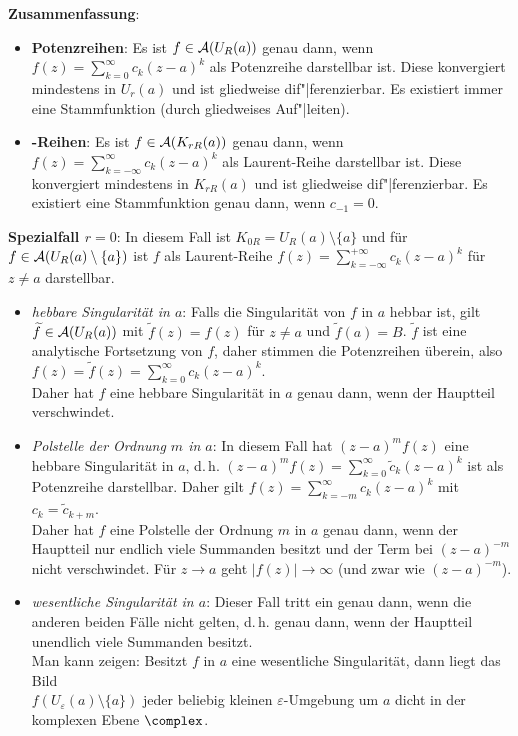 \textbf{Zusammenfassung}:
\begin{itemize}
    \item
    \textbf{Potenzreihen}:
    Es ist $f \in \mathcal{A}(U_R(a))$ genau dann, wenn
    $f(z) = \sum_{k=0}^\infty c_k (z - a)^k$ als Potenzreihe darstellbar ist.
    Diese konvergiert mindestens in $U_r(a)$ und ist gliedweise
    dif"|ferenzierbar.
    Es existiert immer eine Stammfunktion (durch gliedweises Auf"|leiten).
    
    \item
    \textbf{-Reihen}:
    Es ist $f \in \mathcal{A}(K_{rR}(a))$ genau dann, wenn
    $f(z) = \sum_{k=-\infty}^\infty c_k (z - a)^k$ als
    Laurent-Reihe darstellbar ist.
    Diese konvergiert mindestens in $K_{rR}(a)$ und ist gliedweise
    dif"|ferenzierbar.
    Es existiert eine Stammfunktion genau dann, wenn $c_{-1} = 0$.
\end{itemize}

\linie

\textbf{Spezialfall $r = 0$}:
In diesem Fall ist $K_{0R} = U_R(a) \setminus \{a\}$
und für $f \in \mathcal{A}(U_R(a) \setminus \{a\})$ ist $f$ als Laurent-Reihe
$f(z) = \sum_{k=-\infty}^{+\infty} c_k (z - a)^k$ für $z \not= a$ darstellbar.
\begin{itemize}
    \item
    \emph{hebbare Singularität in $a$}:
    Falls die Singularität von $f$ in $a$ hebbar ist,
    gilt $\widetilde{f} \in \mathcal{A}(U_R(a))$ mit
    $\widetilde{f}(z) = f(z)$ für $z \not= a$ und $\widetilde{f}(a) = B$.
    $\widetilde{f}$ ist eine analytische Fortsetzung von $f$, daher stimmen
    die Potenzreihen überein, also
    $f(z) = \widetilde{f}(z) = \sum_{k=0}^\infty c_k (z - a)^k$.\\
    Daher hat $f$ eine hebbare Singularität in $a$ genau dann, wenn der
    Hauptteil verschwindet.
    
    \item
    \emph{Polstelle der Ordnung $m$ in $a$}:
    In diesem Fall hat $(z - a)^m f(z)$ eine hebbare Singularität in $a$,
    d.\,h. $(z - a)^m f(z) = \sum_{k=0}^\infty \widetilde{c}_k (z - a)^k$
    ist als Potenzreihe darstellbar.
    Daher gilt $f(z) = \sum_{k=-m}^\infty c_k (z - a)^k$ mit
    $c_k = \widetilde{c}_{k+m}$.\\
    Daher hat $f$ eine Polstelle der Ordnung $m$ in $a$ genau dann, wenn der
    Hauptteil nur endlich viele Summanden besitzt und der Term bei
    $(z - a)^{-m}$ nicht verschwindet.
    Für $z \to a$ geht $|f(z)| \to \infty$ (und zwar wie $(z - a)^{-m}$).
    
    \item
    \emph{wesentliche Singularität in $a$}:
    Dieser Fall tritt ein genau dann, wenn die anderen beiden Fälle nicht
    gelten, d.\,h. genau dann, wenn
    der Hauptteil unendlich viele Summanden besitzt.\\
    Man kann zeigen:
    Besitzt $f$ in $a$ eine wesentliche Singularität, dann liegt das Bild\\
    $f(U_\varepsilon(a) \setminus \{a\})$ jeder beliebig kleinen
    $\varepsilon$-Umgebung um $a$ dicht in der komplexen Ebene $\complex$.
\end{itemize}

